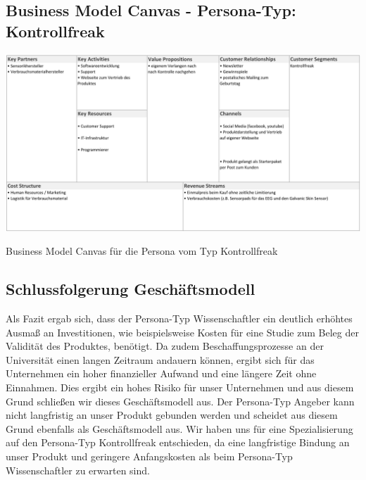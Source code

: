 \documentclass[10pt, a4paper, oneside, titlepage]{scrartcl} %
\begin{document}
\begin{landscape}
	\newpage
	\subsection{Business Model Canvas - Persona-Typ: Kontrollfreak}
   	\begin{table}[h!]
		\begin{center}
			\includegraphics[width=1.3\textwidth]{business_canvas_3_kontrollfreak.png}
		\end{center}
		\caption[Business Model Canvas - Persona-Typ: Kontrollfreak]{Business Model Canvas für die Persona vom Typ Kontrollfreak}
		\label{fig:business_model_3}
	\end{table}

	\newpage
	\subsection{Schlussfolgerung Geschäftsmodell}
	Als Fazit ergab sich, dass der Persona-Typ Wissenschaftler ein deutlich erhöhtes Ausmaß an Investitionen, wie beispielsweise Kosten für eine Studie zum Beleg der Validität des Produktes, benötigt. Da zudem Beschaffungsprozesse an der Universität einen langen Zeitraum andauern können, ergibt sich für das Unternehmen ein hoher finanzieller Aufwand und eine längere Zeit ohne Einnahmen. Dies ergibt ein hohes Risiko für unser Unternehmen und aus diesem Grund schließen wir dieses Geschäftsmodell aus. Der Persona-Typ Angeber kann nicht langfristig an unser Produkt gebunden werden und scheidet aus diesem Grund ebenfalls als Geschäftsmodell aus. Wir haben uns für eine Spezialisierung auf den Persona-Typ Kontrollfreak entschieden, da eine langfristige Bindung an unser Produkt und geringere Anfangskosten als beim Persona-Typ Wissenschaftler zu erwarten sind.


\end{landscape}
\end{document}
